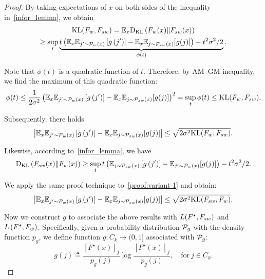 \begin{proof}


By taking expectations of $x$ on both sides of the inequality in~\cref{infor_lemma}, we obtain
\begin{multline*}
    \mathrm{KL}(F_w, F_{sw}) = \mathbb{E}_x \mathrm{D}_{\mathrm{KL}}\left( F_w(x) \| F_{sw}(x) \right) \\ \ge \sup _t \underbrace{t\left(\mathbb{E}_x\mathbb{E}_{j^{\prime} \sim \mathcal{P}_w(x)}\left[g\left(j^{\prime}\right)\right]-\mathbb{E}_x\mathbb{E}_{j \sim \mathcal{P}_{sw}(x)}[g(j)]\right)-t^2 \sigma^2 / 2}_{\phi(t)}.
\end{multline*}


Note that $\phi(t)$ is a quadratic function of $t$.
Therefore, by AM–GM inequality, we find the maximum of this quadratic function:
\begin{align*}
    \phi(t) \le \frac{1}{2\sigma^2}\left(\mathbb{E}_x\mathbb{E}_{j^{\prime} \sim \mathcal{P}_w(x)}\left[g\left(j^{\prime}\right)\right]-\mathbb{E}_x\mathbb{E}_{j \sim \mathcal{P}_{sw}(x)}[g(j)]\right)^2 = \sup _t \phi(t) \le \mathrm{KL}(F_w, F_{sw}).
\end{align*}

Subsequently, there holds
\begin{align} \label{ineq:lower_upper_kl_loss}
\left|\mathbb{E}_x\mathbb{E}_{j^{\prime} \sim \mathcal{P}_w(x)}\left[g\left(j^{\prime}\right)\right]-\mathbb{E}_x\mathbb{E}_{j \sim \mathcal{P}_{sw}(x)}[g(j)]\right| \le \sqrt{2\sigma^2 \mathrm{KL}(F_w, F_{sw})}.
\end{align}

Likewise, according to~\cref{infor_lemma}, we have
\begin{align} \label{proof:variant-1}
    \mathrm{D}_{\mathrm{KL}}\left( F_{sw}(x) \| F_w(x) \right) \ge \sup _t t\left(\mathbb{E}_{j \sim \mathcal{P}_{sw}(x)}\left[g\left(j^{\prime}\right)\right]-\mathbb{E}_{j^{\prime} \sim \mathcal{P}_w(x)}[g(j)]\right)-t^2 \sigma^2 / 2.
\end{align}

We apply the same proof technique to~\eqref{proof:variant-1} and obtain:
\begin{align} \label{proof:variant-2}
    \left|\mathbb{E}_x\mathbb{E}_{j^{\prime} \sim \mathcal{P}_w(x)}\left[g\left(j^{\prime}\right)\right]-\mathbb{E}_x\mathbb{E}_{j \sim \mathcal{P}_{sw}(x)}[g(j)]\right| \le \sqrt{2\sigma^2 \mathrm{KL}(F_{sw}, F_w)}.
\end{align}



Now we construct $g$ to associate the above results with $L(F^\star, F_{sw})$ and $L\left( F^\star, F_w  \right)$.
Specifically, given a probability distribution $\mathcal{P}_g$ with the density function $p_g$, we define function $g: C_k \to (0,1]$ associated with $\mathcal{P}_g$: 
$$g(j) \triangleq \frac{[F^\star(x)]_j}{p_g(j)} \log \frac{[F^\star(x)]_j}{p_g(j)}, \quad \text{for} \ j \in C_k.$$



\end{proof}
